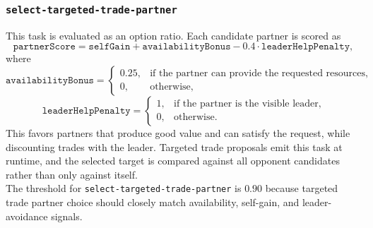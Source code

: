 \documentclass{article}
\begin{document}
\subsubsection{\texttt{select-targeted-trade-partner}}
\label{app:task-select-targeted-trade-partner}
This task is evaluated as an option ratio.
Each candidate partner is scored as
\[
\texttt{partnerScore}
= \texttt{selfGain} + \texttt{availabilityBonus}
- 0.4 \cdot \texttt{leaderHelpPenalty},
\]
where
\[
\texttt{availabilityBonus} =
\begin{cases}
0.25, & \text{if the partner can provide the requested resources},\\
0, & \text{otherwise},
\end{cases}
\]
\[
\texttt{leaderHelpPenalty} =
\begin{cases}
1, & \text{if the partner is the visible leader},\\
0, & \text{otherwise}.
\end{cases}
\]
This favors partners that produce good value and can satisfy the request, while discounting trades with the leader.
Targeted trade proposals emit this task at runtime, and the selected target is compared against all opponent candidates rather than only against itself.
\\
The threshold for \texttt{select-targeted-trade-partner} is $0.90$ because targeted trade partner choice should closely match availability, self-gain, and leader-avoidance signals.
\end{document}
